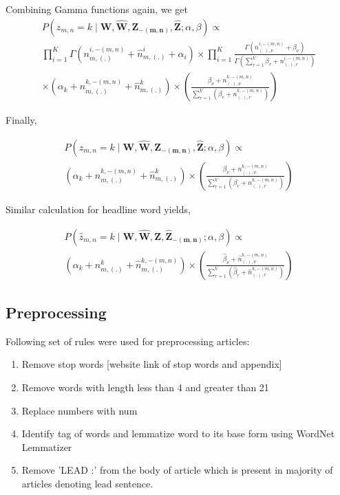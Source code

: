 \documentclass[a4paper]{article}
\begin{document}
 Combining Gamma functions again, we get
 \begin{multline}
 P(z_{m,n} = k \mid \mathbf{W}, \mathbf{\hat{W}}, \mathbf{Z_{-(m,n)}}, \mathbf{\hat{Z}} ; \alpha, \beta ) 
 \propto \\ 
 \prod_{i=1}^{K} \Gamma(n_{m,(.)}^{i,-(m,n)} + \hat{n}_{m,(.)}^{i} + \alpha_{i} ) \times \prod_{i=1}^{K} \frac{\Gamma(n_{(.),\nu}^{i,-(m,n)} + \beta_{\nu} )}{\Gamma(\sum_{r=1}^{V} \beta_{r} + n_{(.),r}^{i,-(m,n)})} \\ 
 \times \left( \alpha_{k} + n_{m,(.)}^{k,-(m,n)} + \hat{n}_{m,(.)}^{k} \right) \times \left( \frac{\beta_{\nu} + n_{(.),\nu}^{k,-(m,n)}}{\sum_{r=1}^{V}(\beta_{r} + n_{(.),r}^{k,-(m,n)})} \right)
  \end{multline}
  
  Finally,
  \begin{mdframed}
  \begin{multline}
   P(z_{m,n} = k \mid \mathbf{W}, \mathbf{\hat{W}}, \mathbf{Z_{-(m,n)}}, \mathbf{\hat{Z}} ; \alpha, \beta ) 
 \propto \\ 
 \left( \alpha_{k} + n_{m,(.)}^{k,-(m,n)} + \hat{n}_{m,(.)}^{k} \right) \times \left( \frac{\beta_{\nu} + n_{(.),\nu}^{k,-(m,n)}}{\sum_{r=1}^{V}(\beta_{r} + n_{(.),r}^{k,-(m,n)})} \right)
  \end{multline}
  \end{mdframed}
  
  Similar calculation for headline word yields,
 \begin{mdframed}
  \begin{multline}
   P(\hat{z}_{m,n} = k \mid \mathbf{W}, \mathbf{\hat{W}}, \mathbf{Z}, \mathbf{\hat{Z}_{-(m,n)}} ; \alpha, \beta ) 
 \propto \\ 
 \left( \alpha_{k} + n_{m,(.)}^{k} + \hat{n}_{m,(.)}^{k,-(m,n)} \right) \times \left( \frac{\hat{\beta}_{\nu} + \hat{n}_{(.),\nu}^{k,-(m,n)}}{\sum_{r=1}^{V}(\hat{\beta}_{r} + \hat{n}_{(.),r}^{k,-(m,n)})} \right)
  \end{multline}
 \end{mdframed}
    

\subsection{Preprocessing} \label{preprocessing}
Following set of rules were used for preprocessing articles:
\begin{enumerate}
\item Remove stop words [website link of stop words and  appendix]
\item Remove words with length less than 4 and greater than 21
\item Replace numbers with num
\item Identify tag of words and lemmatize word to its base form using WordNet Lemmatizer
\item Remove 'LEAD :' from the body of article which is present in majority of articles denoting lead sentence.
\end{enumerate}
\end{document}
